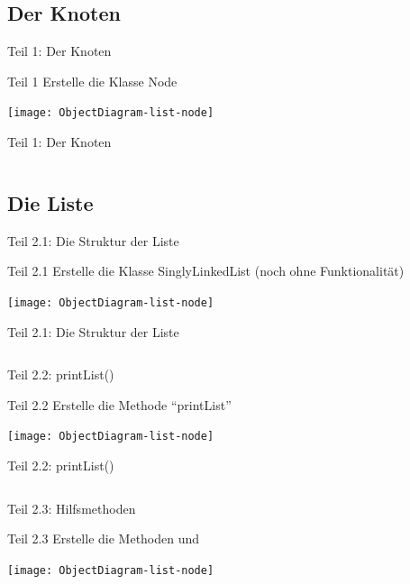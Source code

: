 \documentclass[usepdftitle=false,hyperref={pdfpagelabels=false}]{beamer}
\begin{document}
\subsection{Der Knoten}
\begin{frame}{Teil 1: Der Knoten}
    \begin{block}{Teil 1}
        Erstelle die Klasse Node
    \end{block}
    \texttt{[image: ObjectDiagram-list-node]}
\end{frame}

\begin{frame}{Teil 1: Der Knoten}
    \inputminted[linenos=true, numbersep=5pt, tabsize=4, fontsize=\small, label=Node.java, frame=lines]{java}{Node.java}
\end{frame}

\subsection{Die Liste}
\begin{frame}{Teil 2.1: Die Struktur der Liste}
    \begin{block}{Teil 2.1}
        Erstelle die Klasse SinglyLinkedList (noch ohne Funktionalität)
    \end{block}
    \texttt{[image: ObjectDiagram-list-node]}
\end{frame}

\begin{frame}{Teil 2.1: Die Struktur der Liste}
    \inputminted[linenos=true, numbersep=5pt, tabsize=4, fontsize=\tiny, label=SinglyLinkedList-structure.java]{java}{SinglyLinkedList-structure.java}
\end{frame}

\begin{frame}{Teil 2.2: printList()}
    \begin{block}{Teil 2.2}
        Erstelle die Methode "`printList"'
    \end{block}
    \texttt{[image: ObjectDiagram-list-node]}
\end{frame}

\begin{frame}{Teil 2.2: printList()}
    \inputminted[linenos=true, numbersep=5pt, tabsize=4, fontsize=\tiny, firstnumber=60, firstline=60, lastline=69]{java}{SinglyLinkedList.java}
\end{frame}

\begin{frame}{Teil 2.3: Hilfsmethoden}
    \begin{block}{Teil 2.3}
        Erstelle die Methoden 
        und 
    \end{block}
    \texttt{[image: ObjectDiagram-list-node]}
\end{frame}
\end{document}
